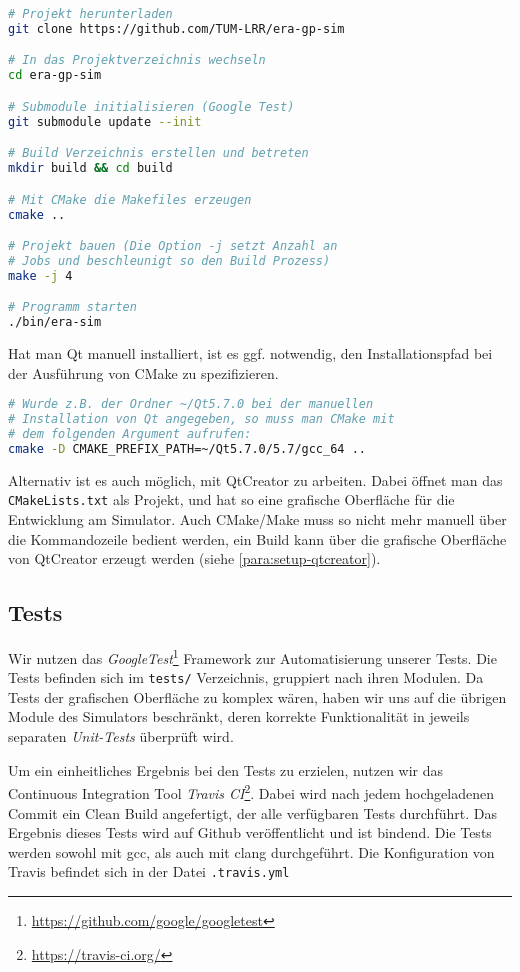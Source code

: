 \begin{lstlisting}[language=bash, keywords={}]
# Projekt herunterladen
git clone https://github.com/TUM-LRR/era-gp-sim

# In das Projektverzeichnis wechseln
cd era-gp-sim

# Submodule initialisieren (Google Test)
git submodule update --init

# Build Verzeichnis erstellen und betreten
mkdir build && cd build

# Mit CMake die Makefiles erzeugen
cmake ..

# Projekt bauen (Die Option -j setzt Anzahl an
# Jobs und beschleunigt so den Build Prozess)
make -j 4

# Programm starten
./bin/era-sim
\end{lstlisting}

Hat man Qt manuell installiert, ist es ggf. notwendig, den Installationspfad bei der
Ausführung von CMake zu spezifizieren.

\begin{lstlisting}[language=bash, keywords={}]
# Wurde z.B. der Ordner ~/Qt5.7.0 bei der manuellen
# Installation von Qt angegeben, so muss man CMake mit
# dem folgenden Argument aufrufen:
cmake -D CMAKE_PREFIX_PATH=~/Qt5.7.0/5.7/gcc_64 ..
\end{lstlisting}

Alternativ ist es auch möglich, mit QtCreator zu arbeiten. Dabei öffnet man das
\texttt{CMakeLists.txt} als Projekt, und hat so eine grafische Oberfläche für
die Entwicklung am Simulator. Auch CMake/Make muss so nicht mehr manuell über
die Kommandozeile bedient werden, ein Build kann über die grafische Oberfläche
von QtCreator erzeugt werden (siehe \autoref{para:setup-qtcreator}).

\subsection{Tests}

Wir nutzen das
\emph{GoogleTest}\footnote{\url{https://github.com/google/googletest}} Framework
zur Automatisierung unserer Tests. Die Tests befinden sich im \texttt{tests/}
Verzeichnis, gruppiert nach ihren Modulen. Da Tests der grafischen Oberfläche zu
komplex wären, haben wir uns auf die übrigen Module des Simulators beschränkt,
deren korrekte Funktionalität in jeweils separaten \emph{Unit-Tests} überprüft
wird.

Um ein einheitliches Ergebnis bei den Tests zu erzielen, nutzen wir das
Continuous Integration Tool \emph{Travis
CI}\footnote{\url{https://travis-ci.org/}}. Dabei wird nach jedem hochgeladenen
Commit ein Clean Build angefertigt, der alle verfügbaren Tests durchführt. Das
Ergebnis dieses Tests wird auf Github veröffentlicht und ist bindend. Die Tests
werden sowohl mit gcc, als auch mit clang durchgeführt. Die Konfiguration von
Travis befindet sich in der Datei \texttt{.travis.yml}

